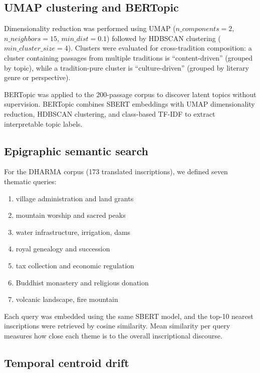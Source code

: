 \documentclass[12pt]{article}
\begin{document}
\subsection{UMAP clustering and BERTopic}

Dimensionality reduction was performed using UMAP \citep{McInnes2018} ($n\_components = 2$, $n\_neighbors = 15$, $min\_dist = 0.1$) followed by HDBSCAN clustering \citep{McInnes2017} ($min\_cluster\_size = 4$).
Clusters were evaluated for cross-tradition composition: a cluster containing passages from multiple traditions is ``content-driven'' (grouped by topic), while a tradition-pure cluster is ``culture-driven'' (grouped by literary genre or perspective).

BERTopic \citep{Grootendorst2022} was applied to the 200-passage corpus to discover latent topics without supervision.
BERTopic combines SBERT embeddings with UMAP dimensionality reduction, HDBSCAN clustering, and class-based TF-IDF to extract interpretable topic labels.

\subsection{Epigraphic semantic search}

For the DHARMA corpus (173 translated inscriptions), we defined seven thematic queries:
\begin{enumerate}
    \item village administration and land grants
    \item mountain worship and sacred peaks
    \item water infrastructure, irrigation, dams
    \item royal genealogy and succession
    \item tax collection and economic regulation
    \item Buddhist monastery and religious donation
    \item volcanic landscape, fire mountain
\end{enumerate}

Each query was embedded using the same SBERT model, and the top-10 nearest inscriptions were retrieved by cosine similarity.
Mean similarity per query measures how close each theme is to the overall inscriptional discourse.

\subsection{Temporal centroid drift}
\end{document}
